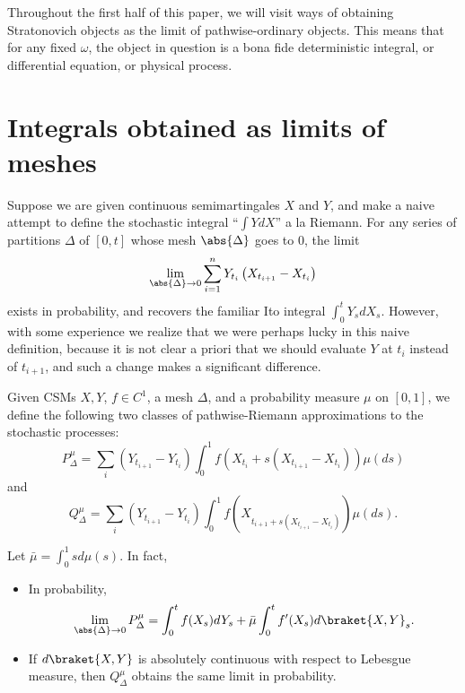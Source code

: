\documentclass{scrartcl}
\begin{document}
Throughout the first half of this paper, we will visit ways of obtaining Stratonovich objects as the limit of pathwise-ordinary objects. This means that for any fixed $\omega$, the object in question is a bona fide deterministic integral, or differential equation, or physical process.


\section{Integrals obtained as limits of meshes}

Suppose we are given continuous semimartingales $X$ and $Y$, and make a naive attempt to define the stochastic integral ``$\int YdX$'' a la Riemann. For any series of partitions $\Delta$ of $[0,t]$ whose mesh $\abs{\Delta}$ goes to $0$, the limit
\[
    \lim_{\abs{\Delta}\to 0} \sum_{i=1}^n Y_{t_i} \left(X_{t_{i+1}} - X_{t_i}\right)    
\]
exists in probability, and recovers the familiar Ito integral $\int_0^t Y_s dX_s$. However, with some experience we realize that we were perhaps lucky in this naive definition, because it is not clear a priori that we should evaluate $Y$ at $t_i$ instead of $t_{i+1}$, and such a change makes a significant difference.

Given CSMs $X,Y$, $f\in C^1$, a mesh $\Delta$, and a probability measure $\mu$ on $[0,1]$, we define the following two classes of pathwise-Riemann approximations to the stochastic processes:
\[
    P^\mu_\Delta = \sum_i \left(Y_{t_{i+1}} - Y_{t_i}\right) \int_0^1 f\left(X_{t_i} + s\left(X_{t_{i+1}} - X_{t_i}\right)\right) \mu(ds)    
\]
and
\[
    Q^\mu_\Delta = \sum_i \left(Y_{t_{i+1}} - Y_{t_i}\right) \int_0^1 f\left(X_{t_{i+1} + s\left(X_{t_{i+1}} - X_{t_i}\right)}\right) \mu(ds).   
\]

\begin{claim*}
    Let $\bar{\mu} = \int_0^1 sd\mu(s)$. In fact,
    \begin{itemize}
        \item In probability,
        \[
            \lim_{\abs{\Delta}\to 0} P^\mu_\Delta = \int_0^t f(X_s) dY_s + \bar{\mu}\int_0^t f'(X_s) d\braket{X, Y}_s.    
        \]
        \item If $d\braket{X,Y}$ is absolutely continuous with respect to Lebesgue measure, then $Q^\mu_\Delta$ obtains the same limit in probability.
    \end{itemize}
\end{claim*}
\end{document}
